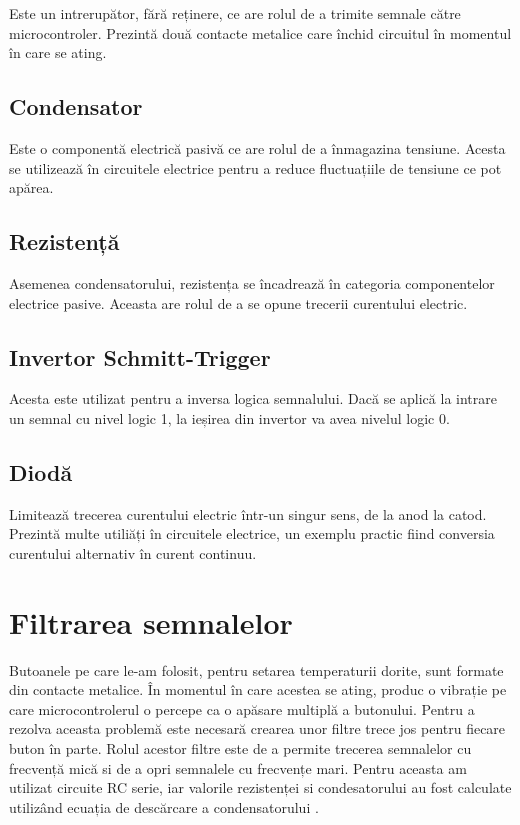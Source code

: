 	Este un intrerupător, fără reținere, ce are rolul de a trimite semnale către microcontroler. Prezintă două contacte metalice care închid circuitul în momentul în care se ating. 

\subsection{Condensator}

	Este o componentă electrică pasivă ce are rolul de a înmagazina tensiune. Acesta se utilizează în circuitele electrice pentru a reduce fluctuațiile de tensiune ce pot apărea.

\subsection{Rezistență}

	Asemenea condensatorului, rezistența se încadrează în categoria componentelor electrice pasive. Aceasta are rolul de a se opune trecerii curentului electric. 

\subsection{Invertor Schmitt-Trigger}

	Acesta este utilizat pentru a inversa logica semnalului. Dacă se aplică la intrare un semnal cu nivel logic 1, la ieșirea din invertor va avea nivelul logic 0.

\subsection{Diodă}

	Limitează trecerea curentului electric într-un singur sens, de la anod la catod. Prezintă multe utiliăți în circuitele electrice, un exemplu practic fiind conversia curentului alternativ în curent continuu. 

\section{Filtrarea semnalelor}

	Butoanele pe care le-am folosit, pentru setarea temperaturii dorite, sunt formate din contacte metalice. În momentul în care acestea se ating, produc o vibrație pe care microcontrolerul o percepe ca o apăsare multiplă a butonului. Pentru a rezolva aceasta problemă este necesară crearea unor filtre trece jos \cite{buttonDebouncing} pentru fiecare buton în parte. Rolul acestor filtre este de a permite trecerea semnalelor cu frecvență mică si de a opri semnalele cu frecvențe mari. Pentru aceasta am utilizat circuite RC serie, iar valorile rezistenței si condesatorului au fost calculate utilizând ecuația de descărcare a condensatorului \cite{buttonDebouncing}.

